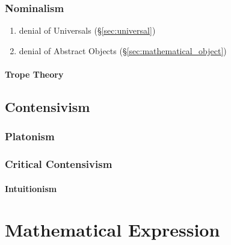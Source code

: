\subsubsection{Nominalism}\label{sec:nominalism}

\begin{enumerate}
  \item denial of Universals (\S\ref{sec:universal})
  \item denial of Abstract Objects (\S\ref{sec:mathematical_object})
\end{enumerate}



\paragraph{Trope Theory}\label{sec:trope_theory}\hfill



\subsection{Contensivism}\label{sec:contensivism}

\subsubsection{Platonism}\label{sec:platonism}

\subsubsection{Critical Contensivism}\label{sec:critical_contensivism}

\paragraph{Intuitionism}\label{sec:intuitionism}\hfill



\section{Mathematical Expression}\label{sec:mathematical_expression}

